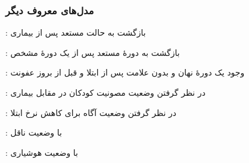 \documentclass[xcolor=dvipsnames, professionalfonts, aspectratio=169, 11pt]{beamer}
\begin{document}
\begin{frame}
    \frametitle{مدل‌های معروف دیگر}

    \begin{moredi}
        \item<1> : بازگشت به حالت مستعد پس از بیماری
        \item<1> :‌ بازگشت به دورهٔ مستعد پس از یک دورهٔ مشخص
        \item<1-2> : وجود یک دورهٔ نهان و بدون علامت پس از ابتلا و قبل از بروز عفونت
        \item<1> : در نظر گرفتن وضعیت مصونیت کودکان در مقابل بیماری
        \item<1-2> : در نظر گرفتن وضعیت آگاه برای کاهش نرخ ابتلا
        \item<1> : با وضعیت ناقل
        \item<1> : با وضعیت هوشیاری

    \end{moredi}

\end{frame}
\end{document}
